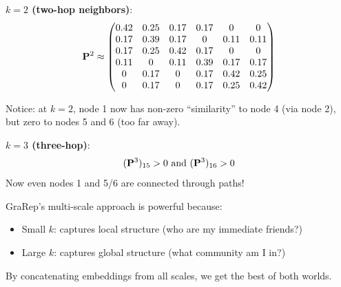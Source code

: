 \begin{notechapter}
\begin{example}
\textbf{$k=2$ (two-hop neighbors)}:
\[
\mathbf{P}^2 \approx \begin{pmatrix}
0.42 & 0.25 & 0.17 & 0.17 & 0 & 0 \\
0.17 & 0.39 & 0.17 & 0 & 0.11 & 0.11 \\
0.17 & 0.25 & 0.42 & 0.17 & 0 & 0 \\
0.11 & 0 & 0.11 & 0.39 & 0.17 & 0.17 \\
0 & 0.17 & 0 & 0.17 & 0.42 & 0.25 \\
0 & 0.17 & 0 & 0.17 & 0.25 & 0.42
\end{pmatrix}
\]

Notice: at $k=2$, node 1 now has non-zero ``similarity'' to node 4 (via node 2), but zero to nodes 5 and 6 (too far away).

\textbf{$k=3$ (three-hop)}:
\[
(\mathbf{P}^3)_{15} > 0 \text{ and } (\mathbf{P}^3)_{16} > 0
\]
Now even nodes 1 and 5/6 are connected through paths!

\begin{center}
\end{center}
\end{example}

\begin{keyinsight}
GraRep's multi-scale approach is powerful because:
\begin{itemize}
    \item Small $k$: captures local structure (who are my immediate friends?)
    \item Large $k$: captures global structure (what community am I in?)
\end{itemize}
By concatenating embeddings from all scales, we get the best of both worlds.
\end{keyinsight}



\end{notechapter}
